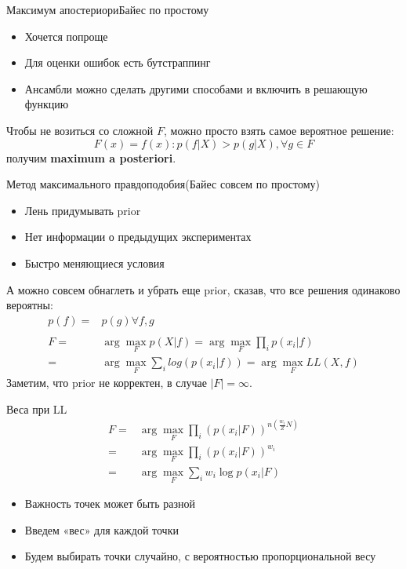 \documentclass[14pt, fleqn, xcolor={dvipsnames, table}]{beamer}
\begin{document}
\begin{frame}{Максимум апостериори}{Байес по простому}
\begin{itemize}
  \item Хочется попроще
  \item Для оценки ошибок есть бутстраппинг
  \item Ансамбли можно сделать другими способами и включить в решающую функцию
\end{itemize}

Чтобы не возиться со сложной $F$, можно просто взять самое вероятное решение:
$$
F(x) = f(x) : p(f|X) > p(g|X), \forall g \in F
$$
получим \textbf{maximum a posteriori}.
\end{frame}

\begin{frame}{Метод максимального правдоподобия}{(Байес совсем по простому)}
\begin{itemize}
  \item Лень придумывать prior
  \item Нет информации о предыдущих экспериментах
  \item Быстро меняющиеся условия
\end{itemize}
А можно совсем обнаглеть и убрать еще prior, сказав, что все решения одинаково вероятны:
$$\begin{array}{rl}
p(f) = & p(g) \forall f,g \\
\\
F = & \arg \max_F p(X|f) = \arg \max_F \prod_i p(x_i | f) \\
= & \arg \max_F \sum_i log(p(x_i | f)) = \arg \max_F LL(X, f)
\end{array}$$
Заметим, что prior не корректен, в случае $|F| = \infty$.
\end{frame}

\begin{frame}{Веса при LL}
$$\begin{array}{rl}
F = & \arg \max_F \prod_i \left(p(x_i | F)\right)^{n(\frac{w_i}{Z}N)} \\
= & \arg \max_F \prod_i \left(p(x_i | F)\right)^{w_i} \\
= & \arg \max_F \sum_i w_i \log p(x_i|F)
\end{array}$$
\begin{itemize}
  \item Важность точек может быть разной
  \item Введем «вес» для каждой точки
  \item Будем выбирать точки случайно, с вероятностью пропорциональной весу
\end{itemize}
\end{frame}
\end{document}

